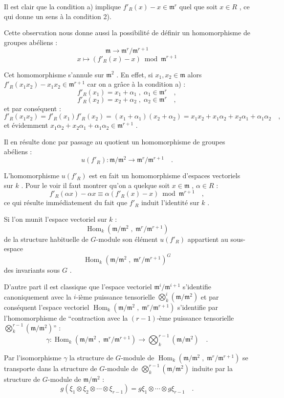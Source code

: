 \documentclass[11pt]{article}
\providecommand{\fm}{\mathfrak{m}}
\DeclareMathOperator{\Hom}{Hom}
\providecommand{\Hom}{\operatorname{Hom}}
\providecommand{\fm}{\mathfrak m}
\providecommand{\Hom}{\operatorname{Hom}}
\begin{document}
Il est clair que la condition a) implique $f'_R(x) - x \in \fm^r$ quel que soit $x \in R$ , ce qui donne un sens à la condition 2).

Cette observation nous donne aussi la possibilité de définir un homomorphisme de groupes abéliens :
\[
\fm \longrightarrow \fm^r/\fm^{r+1}
\]
\[
x \longmapsto (f'_R(x) - x) \bmod \fm^{r+1}
\]

Cet homomorphisme s'annule sur $\fm^2$ . En effet, si $x_1, x_2 \in \fm$ alors $f'_R(x_1x_2) - x_1x_2 \in \fm^{r+1}$ car on a grâce à la condition a) :
\[
f'_R(x_1) = x_1 + \alpha_1 \; , \; \alpha_1 \in \fm^r \quad ,
\]
\[
f'_R(x_2) = x_2 + \alpha_2 \; , \; \alpha_2 \in \fm^r \quad ,
\]
et par conséquent :
\[
f'_R(x_1x_2) = f'_R(x_1)f'_R(x_2) = (x_1 + \alpha_1)(x_2 + \alpha_2) = x_1x_2 + x_1\alpha_2 + x_2\alpha_1 + \alpha_1\alpha_2 \quad ,
\]
et évidemment $x_1\alpha_2 + x_2\alpha_1 + \alpha_1\alpha_2 \in \fm^{r+1}$ .

Il en résulte donc par passage au quotient un homomorphisme de groupes abéliens :
\[
u(f'_R) : \fm/\fm^2 \longrightarrow \fm^r/\fm^{r+1} \quad .
\]

L'homomorphisme $u(f'_R)$ est en fait un homomorphisme d'espaces vectoriels sur $k$ . Pour le voir il faut montrer qu'on a quelque soit $x \in \fm$ , $\alpha \in R$ :
\[
f'_R(\alpha x) - \alpha x \equiv \alpha(f'_R(x) - x) \bmod \fm^{r+1} \quad ,
\]
ce qui résulte immédiatement du fait que $f'_R$ induit l'identité sur $k$ .

Si l'on munit l'espace vectoriel sur $k$ :
\[
\Hom_k(\fm/\fm^2 \; , \; \fm^r/\fm^{r+1})
\]
de la structure habituelle de $G$-module son élément $u(f'_R)$ appartient au sous-espace
\[
\Hom_k(\fm/\fm^2 \; , \; \fm^r/\fm^{r+1})^G
\]
des invariants sous $G$ .

D'autre part il est classique que l'espace vectoriel $\fm^i/\fm^{i+1}$ s'identifie canoniquement avec la $i$-ième puissance tensorielle $\bigotimes_k^i (\fm/\fm^2)$ et par conséquent l'espace vectoriel $\Hom_k(\fm/\fm^2 \; , \; \fm^r/\fm^{r+1})$ s'identifie par l'homomorphisme de ``contraction avec la $(r-1)$-ème puissance tensorielle $\bigotimes_k^{r-1}(\fm/\fm^2)$'' :
\[
\gamma : \Hom_k(\fm/\fm^2 \; , \; \fm^r/\fm^{r+1}) \longrightarrow \bigotimes_k^{r-1}(\fm/\fm^2) \quad .
\]

Par l'isomorphisme $\gamma$ la structure de $G$-module de $\Hom_k(\fm/\fm^2 \; , \; \fm^r/\fm^{r+1})$ se transporte dans la structure de $G$-module de $\bigotimes_k^{r-1}(\fm/\fm^2)$ induite par la structure de $G$-module de $\fm/\fm^2$ :
\[
g(\xi_1 \otimes \xi_2 \otimes \cdots \otimes \xi_{r-1}) = g\xi_1 \otimes \cdots \otimes g\xi_{r-1} \quad .
\]
\end{document}
